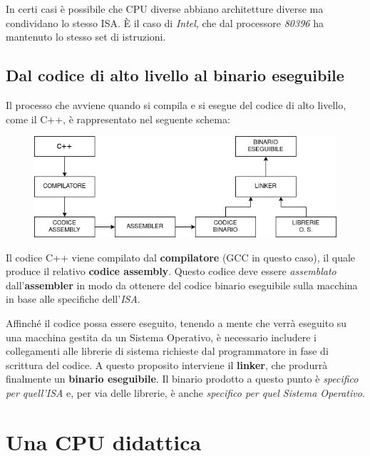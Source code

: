 \documentclass[12pt,oneside]{book}
\begin{document}
In certi casi è possibile che CPU diverse abbiano architetture diverse ma condividano lo stesso ISA. È il caso di \emph{Intel}, che dal processore \emph{80396} ha mantenuto
lo stesso set di istruzioni.

\newpage
\subsection{Dal codice di alto livello al binario eseguibile}
Il processo che avviene quando si compila e si esegue del codice di alto livello, come il C++, è rappresentato nel seguente schema:

\begin{figure}[h]
    \centering
    \includegraphics[scale=0.5]{da_codice_a_binario}
\end{figure}
Il codice C++ viene compilato dal \textbf{compilatore} (GCC in questo caso), il quale produce il relativo \textbf{codice assembly}. Questo codice
deve essere \emph{assemblato} dall'\textbf{assembler} in modo da ottenere del codice binario eseguibile sulla macchina in base alle specifiche dell'\emph{ISA}.

Affinché il codice possa essere eseguito, tenendo a mente che verrà eseguito su una macchina gestita da un Sistema Operativo, è necessario includere i collegamenti alle
librerie di sistema richieste dal programmatore in fase di scrittura del codice. A questo proposito interviene il \textbf{linker}, che produrrà finalmente un \textbf{binario eseguibile}.
Il binario prodotto a questo punto è \emph{specifico per quell'ISA} e, per via delle librerie, è anche \emph{specifico per quel Sistema Operativo}.

\section{Una CPU didattica}
\end{document}
